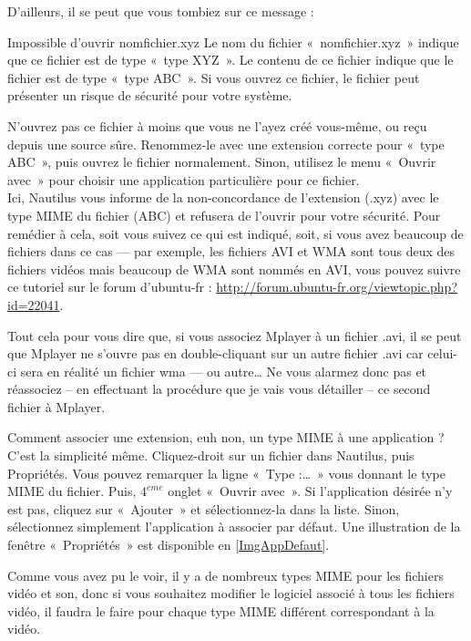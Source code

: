 D'ailleurs, il se peut que vous tombiez sur ce message :
\begin{citationlongue}{Impossible d'ouvrir nomfichier.xyz}
Le nom du fichier «~nomfichier.xyz~» indique que ce fichier est de type «~type XYZ~». Le contenu de ce fichier indique que le fichier est de type «~type ABC~». Si vous ouvrez ce fichier, le fichier peut présenter un risque de sécurité pour votre système.
\end{citationlongue}
N'ouvrez pas ce fichier à moins que vous ne l'ayez créé vous-même, ou reçu depuis une source sûre. Renommez-le avec une extension correcte pour «~type ABC~», puis ouvrez le fichier normalement. Sinon, utilisez le menu «~Ouvrir avec~» pour choisir une application particulière pour ce fichier.\\
Ici, Nautilus vous informe de la non-concordance de l'extension (.xyz) avec le type MIME du fichier (ABC) et refusera de l'ouvrir pour votre sécurité. Pour remédier à cela, soit vous suivez ce qui est indiqué, soit, si vous avez beaucoup de fichiers dans ce cas --- par exemple, les fichiers AVI et WMA sont tous deux des fichiers vidéos mais beaucoup de WMA sont nommés en AVI, vous pouvez suivre ce tutoriel sur le forum d'ubuntu-fr : \url{http://forum.ubuntu-fr.org/viewtopic.php?id=22041}.\par
Tout cela pour vous dire que, si vous associez Mplayer à un fichier .avi, il se peut que Mplayer ne s'ouvre pas en double-cliquant sur un autre fichier .avi car celui-ci sera en réalité un fichier wma --- ou autre\ldots{} Ne vous alarmez donc pas et réassociez -- en effectuant la procédure que je vais vous détailler -- ce second fichier à Mplayer.\par
Comment associer une extension, euh non, un type MIME à une application ?\\
C'est la simplicité même. Cliquez-droit sur un fichier dans Nautilus, puis Propriétés. Vous pouvez remarquer la ligne «~Type :\ldots{}~» vous donnant le type MIME du fichier. Puis, $4^{eme}$ onglet «~Ouvrir avec~». Si l'application désirée n'y est pas, cliquez sur «~Ajouter~» et sélectionnez-la dans la liste. Sinon, sélectionnez simplement l'application à associer par défaut. Une illustration de la fenêtre «~Propriétés~» est disponible en \ref{ImgAppDefaut}.\par
{}
\begin{nota}
Comme vous avez pu le voir, il y a de nombreux types MIME pour les fichiers vidéo et son, donc si vous souhaitez modifier le logiciel associé à tous les fichiers vidéo, il faudra le faire pour chaque type MIME différent correspondant à la vidéo.
\end{nota}
